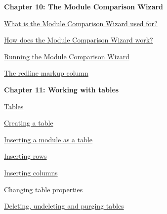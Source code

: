 \documentclass[11pt,a4paper]{article}
\begin{document}
\begin{Large}\textbf{Chapter 10: The Module Comparison Wizard} \end{Large} 
\vspace{1mm}

\href{https://www.ibm.com/support/knowledgecenter/search/What%20is%20the%20Module%20Comparison%20Wizard%20used%20for??scope=SSYQBZ_9.6.1}{What is the Module Comparison Wizard used for?}

\href{https://www.ibm.com/support/knowledgecenter/search/How%20does%20the%20Module%20Comparison%20Wizard%20work??scope=SSYQBZ_9.6.1}{How does the Module Comparison Wizard work?}

\href{https://www.ibm.com/support/knowledgecenter/search/Running%20the%20Module%20Comparison%20Wizard?scope=SSYQBZ_9.6.1}{Running the Module Comparison Wizard}

\href{https://www.ibm.com/support/knowledgecenter/search/The%20redline%20markup%20column?scope=SSYQBZ_9.6.1}{The redline markup column} \\



\begin{Large}\textbf{Chapter 11: Working with tables} \end{Large} 
\vspace{1mm}

\href{https://www.ibm.com/support/knowledgecenter/search/Tables?scope=SSYQBZ_9.6.1}{Tables}

\href{https://www.ibm.com/support/knowledgecenter/search/Creating%20a%20table?scope=SSYQBZ_9.6.1}{Creating a table}

\href{https://www.ibm.com/support/knowledgecenter/search/Inserting%20a%20module%20as%20a%20table?scope=SSYQBZ_9.6.1}{Inserting a module as a table}

\href{https://www.ibm.com/support/knowledgecenter/search/Inserting%20rows?scope=SSYQBZ_9.6.1}{Inserting rows}

\href{https://www.ibm.com/support/knowledgecenter/search/Inserting%20columns?scope=SSYQBZ_9.6.1}{Inserting columns}

\href{https://www.ibm.com/support/knowledgecenter/search/Changing%20table%20properties?scope=SSYQBZ_9.6.1}{Changing table properties}

\href{https://www.ibm.com/support/knowledgecenter/search/Deleting,%20undeleting%20and%20purging%20tables?scope=SSYQBZ_9.6.1}{Deleting, undeleting and purging tables} \\
\end{document}
